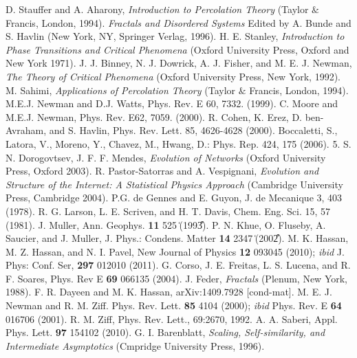 \documentclass[twocolumn,showpacs,preprintnumbers,amsmath,amssymb]{article}
\begin{document}
\begin{thebibliography}{99}
 D. Stauffer and A. Aharony, {\it Introduction to Percolation Theory} (Taylor $\&$ Francis, London, 1994).
 {\it Fractals and Disordered Systems} Edited by A. Bunde and S. Havlin  
(New York, NY, Springer Verlag, 1996).
 H. E. Stanley, {\it Introduction to Phase Transitions and Critical Phenomena} (Oxford University Press, Oxford and New York 1971).
 J.  J.  Binney,  N.  J.  Dowrick,  A.  J.  Fisher,  and  M.  E.  J.  Newman,  {\it The  Theory  of
Critical  Phenomena}  (Oxford University Press, New York, 1992).
 M. Sahimi, {\it Applications of Percolation Theory} (Taylor $\&$ Francis, London, 1994).
 M.E.J. Newman and D.J. Watts, Phys. Rev. E 60, 7332. (1999).
  C. Moore and M.E.J. Newman, Phys. Rev. E62, 7059. (2000).
 R. Cohen, K. Erez, D. ben-Avraham, and S. Havlin, Phys. Rev. Lett. 85, 4626-4628 (2000).
 Boccaletti, S., Latora, V., Moreno, Y., Chavez, M., Hwang, D.: Phys. Rep.
424, 175 (2006).
5. S. N. Dorogovtsev, J. F. F. Mendes, {\it Evolution of Networks} (Oxford University Press, Oxford 2003).
 R. Pastor-Satorras and A. Vespignani, {\it Evolution and Structure of the Internet: A Statistical Physics Approach} (Cambridge University Press, Cambridge 2004).
 P.G. de Gennes and E. Guyon, J. de Mecanique 3, 403 (1978).
 R. G. Larson, L. E. Scriven, and H. T. Davis, Chem. Eng. Sci. 15, 57 (1981).
 J. Muller, Ann. Geophys. {\bf 11} 525 ͑(1993͒).
 P. N. Khue, O. Fluseby, A. Saucier, and J. Muller, J. Phys.:
Condens. Matter {\bf 14} 2347 ͑(2002͒).
 M. K. Hassan, M. Z. Hassan, and N. I. Pavel, New Journal of Physics {\bf 12}  093045 (2010); {\it ibid} J. Phys: Conf. Ser, {\bf 297} 012010 (2011).
 G. Corso, J. E. Freitas, L. S. Lucena, and R. F. Soares, Phys. Rev E {\bf 69} 066135 (2004).
 J. Feder,  {\it Fractals} (Plenum, New York,  1988).
 F. R. Dayeen and M. K. Hassan, arXiv:1409.7928 [cond-mat].
 M. E. J. Newman  and R. M. Ziff. Phys. Rev. Lett. {\bf 85} 4104 (2000); {\it ibid} Phys. Rev. E {\bf 64} 016706 (2001).
 R. M. Ziff, Phys. Rev. Lett., 69:2670, 1992.
 A. A. Saberi, Appl. Phys. Lett. {\bf 97} 154102 (2010).
 G. I. Barenblatt, {\it Scaling, Self-similarity, and Intermediate Asymptotics} (Cmpridge University Press, 1996).






\end{thebibliography}
\end{document}
